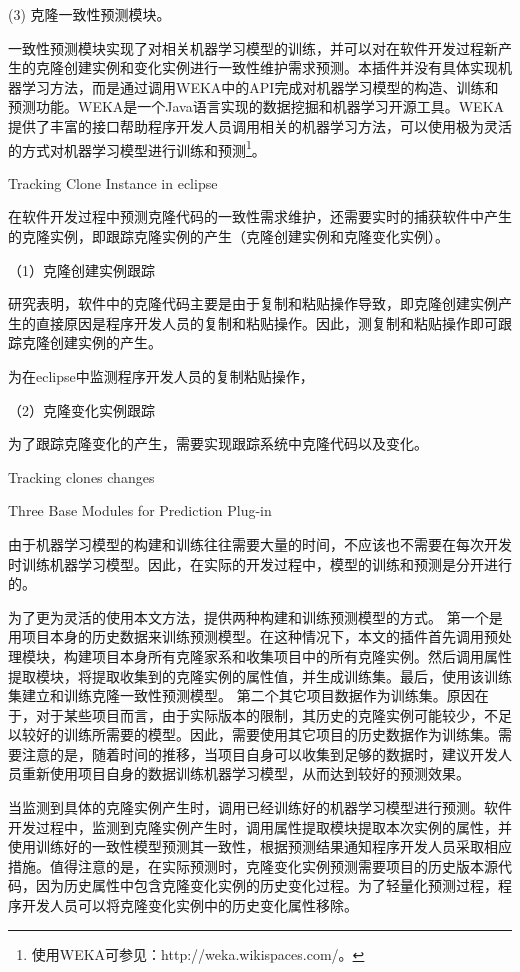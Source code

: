 (3) 克隆一致性预测模块。

一致性预测模块实现了对相关机器学习模型的训练，并可以对在软件开发过程新产生的克隆创建实例和变化实例进行一致性维护需求预测。本插件并没有具体实现机器学习方法，而是通过调用WEKA中的API完成对机器学习模型的构造、训练和预测功能。WEKA是一个Java语言实现的数据挖掘和机器学习开源工具。WEKA提供了丰富的接口帮助程序开发人员调用相关的机器学习方法，可以使用极为灵活的方式对机器学习模型进行训练和预测\footnote{使用WEKA可参见：http://weka.wikispaces.com/。}。


{Tracking Clone Instance in eclipse }

在软件开发过程中预测克隆代码的一致性需求维护，还需要实时的捕获软件中产生的克隆实例，即跟踪克隆实例的产生（克隆创建实例和克隆变化实例）。

（1）克隆创建实例跟踪

研究表明，软件中的克隆代码主要是由于复制和粘贴操作导致，即克隆创建实例产生的直接原因是程序开发人员的复制和粘贴操作。因此，测复制和粘贴操作即可跟踪克隆创建实例的产生。


为在eclipse中监测程序开发人员的复制粘贴操作，


（2）克隆变化实例跟踪

为了跟踪克隆变化的产生，需要实现跟踪系统中克隆代码以及变化。


Tracking clones changes

{Three Base Modules for Prediction Plug-in }

由于机器学习模型的构建和训练往往需要大量的时间，不应该也不需要在每次开发时训练机器学习模型。因此，在实际的开发过程中，模型的训练和预测是分开进行的。

为了更为灵活的使用本文方法，提供两种构建和训练预测模型的方式。
第一个是用项目本身的历史数据来训练预测模型。在这种情况下，本文的插件首先调用预处理模块，构建项目本身所有克隆家系和收集项目中的所有克隆实例。然后调用属性提取模块，将提取收集到的克隆实例的属性值，并生成训练集。最后，使用该训练集建立和训练克隆一致性预测模型。
第二个其它项目数据作为训练集。原因在于，对于某些项目而言，由于实际版本的限制，其历史的克隆实例可能较少，不足以较好的训练所需要的模型。因此，需要使用其它项目的历史数据作为训练集。需要注意的是，随着时间的推移，当项目自身可以收集到足够的数据时，建议开发人员重新使用项目自身的数据训练机器学习模型，从而达到较好的预测效果。

当监测到具体的克隆实例产生时，调用已经训练好的机器学习模型进行预测。软件开发过程中，监测到克隆实例产生时，调用属性提取模块提取本次实例的属性，并使用训练好的一致性模型预测其一致性，根据预测结果通知程序开发人员采取相应措施。值得注意的是，在实际预测时，克隆变化实例预测需要项目的历史版本源代码，因为历史属性中包含克隆变化实例的历史变化过程。为了轻量化预测过程，程序开发人员可以将克隆变化实例中的历史变化属性移除。


